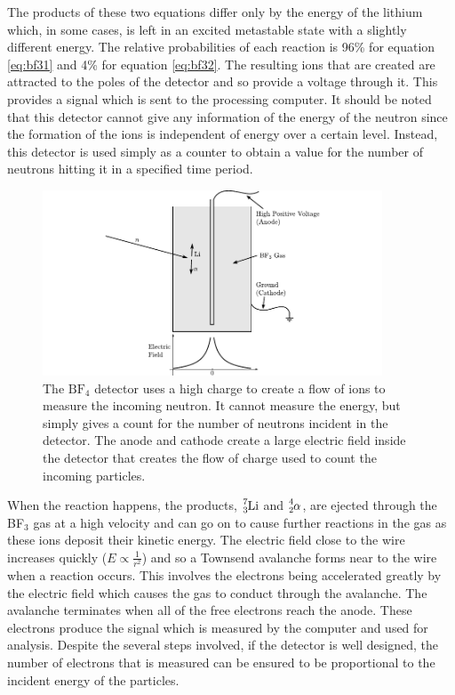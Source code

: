 The products of these two equations differ only by the energy of the lithium which, in some cases, is left in an excited metastable state with a slightly different energy. The relative probabilities of each reaction is 96\% for equation \ref{eq:bf31} and 4\% for equation \ref{eq:bf32}\cite{baratta}. The resulting ions that are created are attracted to the poles of the detector and so provide a voltage through it. This provides a signal which is sent to the processing computer. It should be noted that this detector cannot give any information of the energy of the neutron since the formation of the ions is independent of energy over a certain level. Instead, this detector is used simply as a counter to obtain a value for the number of neutrons hitting it in a specified time period. 
\begin{figure}[ht]
	\centering
	\includegraphics[width=0.9\textwidth]{BF3detector.pdf}
	\caption{The $\text{BF}_4$ detector uses a high charge to create a flow of ions to measure the incoming neutron. It cannot measure the energy, but simply gives a count for the number of neutrons incident in the detector. The anode and cathode create a large electric field inside the detector that creates the flow of charge used to count the incoming particles.\label{fig:bf3detector}}
\end{figure}

When the reaction happens, the products, $\cf{^{7}_{3}Li}$ and $\cf{^4_2\alpha}$, are ejected through the BF$_3$ gas at a high velocity and can go on to cause further reactions in the gas as these ions deposit their kinetic energy. The electric field close to the wire increases quickly ($E\propto\frac{1}{r^2}$) and so a Townsend avalanche forms near to the wire when a reaction occurs. This involves the electrons being accelerated greatly by the electric field which causes the gas to conduct through the avalanche. The avalanche terminates when all of the free electrons reach the anode. These electrons produce the signal which is measured by the computer and used for analysis. Despite the several steps involved, if the detector is well designed, the number of electrons that is measured can be ensured to be proportional to the incident energy of the particles\cite{krane}.

